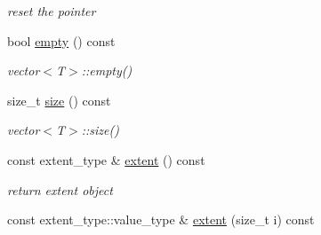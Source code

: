 \begin{DoxyCompactItemize}
\begin{DoxyCompactList}\small\item\em reset the pointer \item\end{DoxyCompactList}\item 
\hypertarget{classbtas_1_1_tensor_wrapper_3_01_t_01_5_00_01_n_00_01_order_01_4_a9b963c9a02d1993656790e181daf8906}{
bool \hyperlink{classbtas_1_1_tensor_wrapper_3_01_t_01_5_00_01_n_00_01_order_01_4_a9b963c9a02d1993656790e181daf8906}{empty} () const }
\label{classbtas_1_1_tensor_wrapper_3_01_t_01_5_00_01_n_00_01_order_01_4_a9b963c9a02d1993656790e181daf8906}

\begin{DoxyCompactList}\small\item\em vector$<$T$>$::empty() \item\end{DoxyCompactList}\item 
\hypertarget{classbtas_1_1_tensor_wrapper_3_01_t_01_5_00_01_n_00_01_order_01_4_afe49956cb8209c5ec63781298c001eac}{
size\_\-t \hyperlink{classbtas_1_1_tensor_wrapper_3_01_t_01_5_00_01_n_00_01_order_01_4_afe49956cb8209c5ec63781298c001eac}{size} () const }
\label{classbtas_1_1_tensor_wrapper_3_01_t_01_5_00_01_n_00_01_order_01_4_afe49956cb8209c5ec63781298c001eac}

\begin{DoxyCompactList}\small\item\em vector$<$T$>$::size() \item\end{DoxyCompactList}\item 
\hypertarget{classbtas_1_1_tensor_wrapper_3_01_t_01_5_00_01_n_00_01_order_01_4_a94353d9b5477cca9af870e0759733d53}{
const extent\_\-type \& \hyperlink{classbtas_1_1_tensor_wrapper_3_01_t_01_5_00_01_n_00_01_order_01_4_a94353d9b5477cca9af870e0759733d53}{extent} () const }
\label{classbtas_1_1_tensor_wrapper_3_01_t_01_5_00_01_n_00_01_order_01_4_a94353d9b5477cca9af870e0759733d53}

\begin{DoxyCompactList}\small\item\em return extent object \item\end{DoxyCompactList}\item 
\hypertarget{classbtas_1_1_tensor_wrapper_3_01_t_01_5_00_01_n_00_01_order_01_4_a54a6d4303b323d30bcfc798202217ef6}{
const extent\_\-type::value\_\-type \& \hyperlink{classbtas_1_1_tensor_wrapper_3_01_t_01_5_00_01_n_00_01_order_01_4_a54a6d4303b323d30bcfc798202217ef6}{extent} (size\_\-t i) const }
\label{classbtas_1_1_tensor_wrapper_3_01_t_01_5_00_01_n_00_01_order_01_4_a54a6d4303b323d30bcfc798202217ef6}


\end{DoxyCompactItemize}
